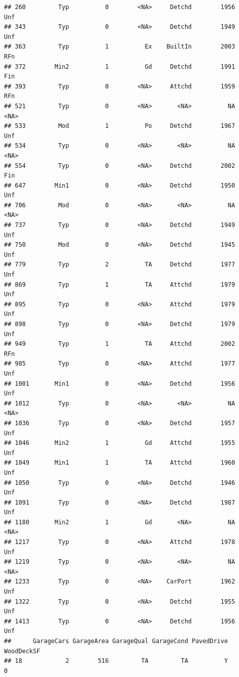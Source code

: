 \documentclass[]{article}
\begin{document}
\begin{verbatim}
## 260         Typ          0        <NA>     Detchd        1956          Unf
## 343         Typ          0        <NA>     Detchd        1949          Unf
## 363         Typ          1          Ex    BuiltIn        2003          RFn
## 372        Min2          1          Gd     Detchd        1991          Fin
## 393         Typ          0        <NA>     Attchd        1959          RFn
## 521         Typ          0        <NA>       <NA>          NA         <NA>
## 533         Mod          1          Po     Detchd        1967          Unf
## 534         Typ          0        <NA>       <NA>          NA         <NA>
## 554         Typ          0        <NA>     Detchd        2002          Fin
## 647        Min1          0        <NA>     Detchd        1950          Unf
## 706         Mod          0        <NA>       <NA>          NA         <NA>
## 737         Typ          0        <NA>     Detchd        1949          Unf
## 750         Mod          0        <NA>     Detchd        1945          Unf
## 779         Typ          2          TA     Detchd        1977          Unf
## 869         Typ          1          TA     Attchd        1979          Unf
## 895         Typ          0        <NA>     Attchd        1979          Unf
## 898         Typ          0        <NA>     Detchd        1979          Unf
## 949         Typ          1          TA     Attchd        2002          RFn
## 985         Typ          0        <NA>     Attchd        1977          Unf
## 1001       Min1          0        <NA>     Detchd        1956          Unf
## 1012        Typ          0        <NA>       <NA>          NA         <NA>
## 1036        Typ          0        <NA>     Detchd        1957          Unf
## 1046       Min2          1          Gd     Attchd        1955          Unf
## 1049       Min1          1          TA     Attchd        1960          Unf
## 1050        Typ          0        <NA>     Detchd        1946          Unf
## 1091        Typ          0        <NA>     Detchd        1987          Unf
## 1180       Min2          1          Gd       <NA>          NA         <NA>
## 1217        Typ          0        <NA>     Attchd        1978          Unf
## 1219        Typ          0        <NA>       <NA>          NA         <NA>
## 1233        Typ          0        <NA>    CarPort        1962          Unf
## 1322        Typ          0        <NA>     Detchd        1955          Unf
## 1413        Typ          0        <NA>     Detchd        1956          Unf
##      GarageCars GarageArea GarageQual GarageCond PavedDrive WoodDeckSF
## 18            2        516         TA         TA          Y          0

\end{verbatim}
\end{document}
